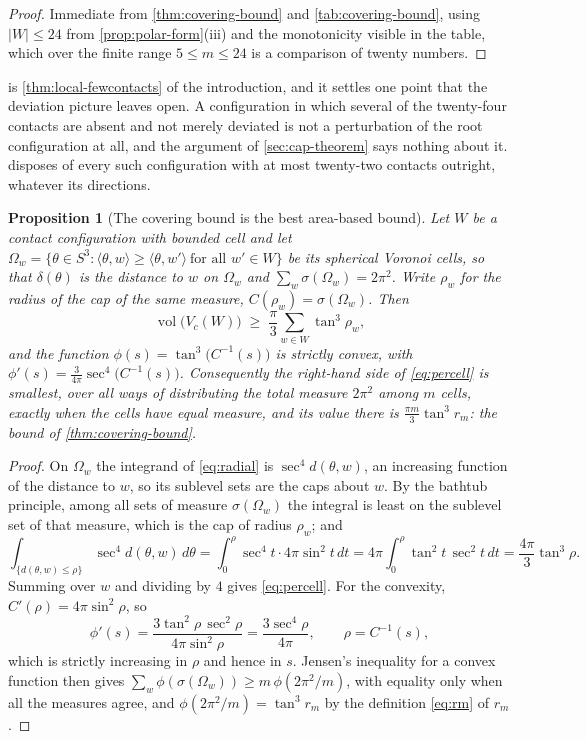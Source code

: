 \documentclass[11pt,reqno]{amsart}
\renewcommand{\_}{\origunderscore\allowbreak}
\numberwithin{equation}{section}
\theoremstyle{plain}
\newtheorem{prop}[thm]{Proposition}
\theoremstyle{definition}
\theoremstyle{remark}
\DeclareMathOperator{\vol}{vol}
\begin{document}
\begin{proof}
Immediate from \cref{thm:covering-bound} and
\cref{tab:covering-bound}, using $|W|\le24$ from
\cref{prop:polar-form}(iii) and the monotonicity visible in the table,
which over the finite range $5\le m\le24$ is a comparison of twenty
numbers.
\end{proof}

 is \cref{thm:local-fewcontacts} of the introduction, and
it settles one point that the deviation picture leaves open. A
configuration in which several of the twenty-four contacts are absent and not merely deviated is not a perturbation of the root
configuration at all, and the argument of \cref{sec:cap-theorem} says
nothing about it.  disposes of every such configuration
with at most twenty-two contacts outright, whatever its directions.

\begin{prop}[The covering bound is the best area-based bound]\label{prop:area-optimal}
Let $W$ be a contact configuration with bounded cell and let
$\Omega_w=\{\theta\in S^3:\langle\theta,w\rangle\ge\langle\theta,w'\rangle
\ \text{for all }w'\in W\}$ be its spherical Voronoi cells, so that
$\delta(\theta)$ is the distance to $w$ on $\Omega_w$ and
$\sum_w\sigma(\Omega_w)=2\pi^2$. Write $\rho_w$ for the radius of the
cap of the same measure, $C(\rho_w)=\sigma(\Omega_w)$. Then
\begin{equation}\label{eq:percell}
  \vol\bigl(V_c(W)\bigr)\;\ge\;\frac{\pi}{3}\sum_{w\in W}\tan^3\rho_w ,
\end{equation}
and the function $\phi(s)=\tan^3\bigl(C^{-1}(s)\bigr)$ is strictly
convex, with $\phi'(s)=\tfrac{3}{4\pi}\sec^4\bigl(C^{-1}(s)\bigr)$.
Consequently the right-hand side of \eqref{eq:percell} is smallest, over
all ways of distributing the total measure $2\pi^2$ among $m$ cells,
exactly when the cells have equal measure, and its value there is
$\tfrac{\pi m}{3}\tan^3r_m$: the bound of \cref{thm:covering-bound}.
\end{prop}

\begin{proof}
On $\Omega_w$ the integrand of \eqref{eq:radial} is
$\sec^4 d(\theta,w)$, an increasing function of the distance to $w$, so
its sublevel sets are the caps about $w$. By the bathtub principle, among
all sets of measure $\sigma(\Omega_w)$ the integral is least on the
sublevel set of that measure, which is the cap of radius $\rho_w$; and
\[
  \int_{\{d(\theta,w)\le\rho\}}\sec^4d(\theta,w)\,d\theta
  =\int_0^{\rho}\sec^4t\cdot4\pi\sin^2t\,dt
  =4\pi\int_0^{\rho}\tan^2t\,\sec^2t\,dt
  =\frac{4\pi}{3}\tan^3\rho .
\]
Summing over $w$ and dividing by $4$ gives \eqref{eq:percell}. For the
convexity, $C'(\rho)=4\pi\sin^2\rho$, so
\[
  \phi'(s)=\frac{3\tan^2\rho\,\sec^2\rho}{4\pi\sin^2\rho}
  =\frac{3\sec^4\rho}{4\pi},\qquad \rho=C^{-1}(s),
\]
which is strictly increasing in $\rho$ and hence in $s$. Jensen's
inequality for a convex function then gives
$\sum_w\phi(\sigma(\Omega_w))\ge m\,\phi(2\pi^2/m)$, with equality only
when all the measures agree, and $\phi(2\pi^2/m)=\tan^3r_m$ by the
definition \eqref{eq:rm} of $r_m$.
\end{proof}
\end{document}
